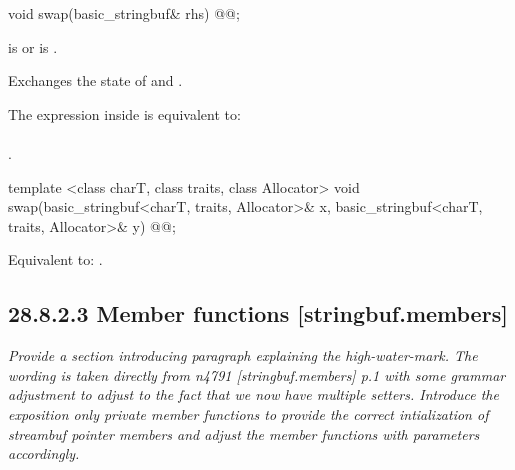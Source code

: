 \documentclass[ebook,11pt,article]{memoir}
\begin{document}
%
\begin{itemdecl}
void swap(basic_stringbuf& rhs) @@;
\end{itemdecl}

\begin{itemdescr}
\begin{addedblock}
\pnum
\expects {} is  or  is .
\end{addedblock}

\pnum
\effects Exchanges the state of 
and . 

\begin{addedblock}
\pnum
\remarks The expression inside  is equivalent to: \\
\\
.
\end{addedblock}
\end{itemdescr}

%
\begin{itemdecl}
template <class charT, class traits, class Allocator>
  void swap(basic_stringbuf<charT, traits, Allocator>& x,
            basic_stringbuf<charT, traits, Allocator>& y) @@;
\end{itemdecl}

\begin{itemdescr}
\pnum
\effects Equivalent to: .
\end{itemdescr}


\subsection{28.8.2.3 Member functions [stringbuf.members]}

\textit{Provide a section introducing paragraph explaining the high-water-mark. The wording is taken directly from n4791 [stringbuf.members] p.1 with some grammar adjustment to adjust to the fact that we now have multiple setters. Introduce the exposition only private member functions  to provide the correct intialization of streambuf pointer members and adjust the  member functions with parameters accordingly. }
\end{document}
